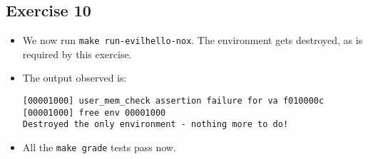 \documentclass[]{article}
\begin{document}
\subsection{Exercise 10}

\begin{itemize}
\item
  We now run \texttt{make run-evilhello-nox}. The environment gets
  destroyed, as is required by this exercise.
\item
  The output observed is:

\begin{verbatim}
[00001000] user_mem_check assertion failure for va f010000c
[00001000] free env 00001000
Destroyed the only environment - nothing more to do!
\end{verbatim}
\item
  All the \texttt{make grade} tests pass now.
\end{itemize}
\end{document}
